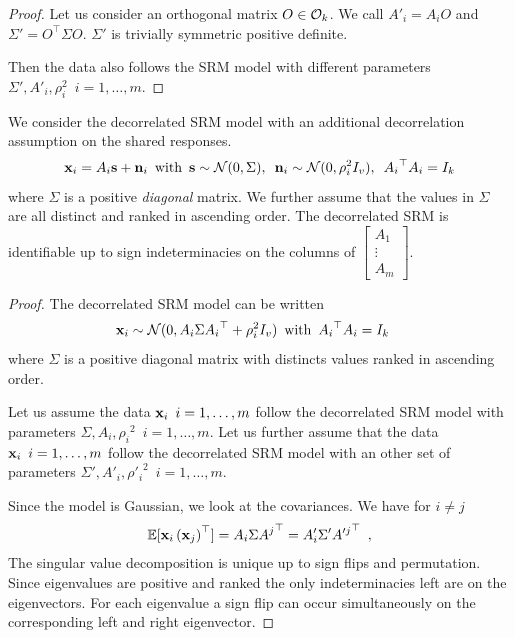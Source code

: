 \documentclass{report}
\begin{document}
{\begin{proof}
Let us consider an orthogonal matrix $O \in \mathcal{O}_k$.
We call $A'_i = A_i O$ and $\Sigma' = O^{\top} \Sigma O$. 
$\Sigma'$ is trivially symmetric positive definite.

Then the data also follows the SRM model with different parameters $\Sigma', A'_i, \rho_i^2 \enspace i=1, \dots, m$.
\end{proof}

\begin{proposition}
We consider the decorrelated SRM model with an additional decorrelation assumption on the shared responses.
\begin{align*}
\mathbf{x}_i = A_i \mathbf{s} + \mathbf{n}_i \enspace \text{with} \enspace \mathbf{s} \sim \mathcal{N}(0, \Sigma), \enspace\mathbf{n}_i \sim \mathcal{N}(0, \rho_i^2 I_v), \enspace {A_i}^{\top}A_i = I_k
\end{align*}
where $\Sigma$ is a positive \emph{diagonal} matrix. We further assume that the values in $\Sigma$ are all distinct and ranked in ascending order.
The decorrelated SRM is identifiable up to sign indeterminacies on the columns of 
$\begin{bmatrix}
A_1 \\
\vdots \\
A_m
\end{bmatrix}
$.
\end{proposition}
\begin{proof}
The decorrelated SRM model can be written
\begin{align*}
    &\mathbf{x}_i \sim \mathcal{N}(0, A_i \Sigma {A_i}^{\top} + \rho_i^2 I_v) \enspace \text{with}\enspace  {A_i}^{\top}A_i = I_k
\end{align*}
where $\Sigma$ is a positive diagonal matrix with distincts values ranked in ascending order.

Let us assume the data $\mathbf{x}_i \enspace i=1, \dots, m$ follow the decorrelated SRM model with parameters $\Sigma, A_i, {\rho_i}^2 \enspace i=1, \dots, m$. Let us further assume that the data $\mathbf{x}_i \enspace i=1, \dots, m$ follow the decorrelated SRM model with an other set of parameters $\Sigma', A'_i, {\rho'_i}^2 \enspace i=1, \dots, m$.

Since the model is Gaussian, we look at the covariances.
We have for $i \neq j$
\begin{align*}
    \mathbb{E}[\mathbf{x}_i\left(\mathbf{x}_j\right)^{\top}] = A_i\Sigma {A^j}^{\top} = A'_i \Sigma'{A'^j}^{\top} \enspace, 
\end{align*}
The singular value decomposition is unique up to sign flips and permutation. Since eigenvalues are positive and ranked the only indeterminacies left are on the eigenvectors. For each eigenvalue a sign flip can occur simultaneously on the corresponding left and right eigenvector.


\end{proof}}
\end{document}
